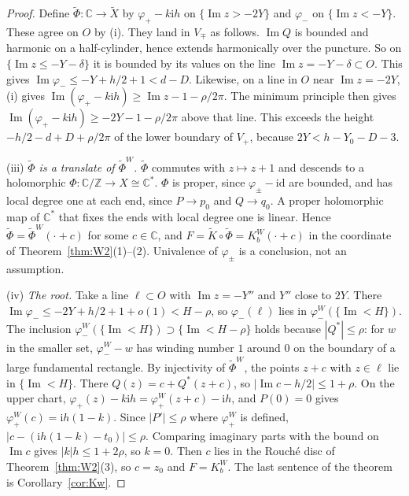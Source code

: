 \documentclass[11pt]{amsart}
\theoremstyle{definition}
\newcommand{\Kk}{K}
\newcommand{\ii}{\mathrm{i}}
\begin{document}
\begin{proof}
Define $\tilde\Phi:\mathbb C\to\tilde X$ by $\varphi_+-k\ii h$ on
$\{\operatorname{Im}z>-2Y\}$ and $\varphi_-$ on $\{\operatorname{Im}z<-Y\}$.
These agree on $O$ by (i).  They land in $V_\mp$ as follows.
$\operatorname{Im}Q$ is bounded and harmonic on a half-cylinder, hence extends
harmonically over the puncture.  So on $\{\operatorname{Im}z\le-Y-\delta\}$ it is
bounded by its values on the line $\operatorname{Im}z=-Y-\delta\subset O$.
This gives $\operatorname{Im}\varphi_-\le-Y+h/2+1<d-D$.  Likewise, on a line
in $O$ near $\operatorname{Im}z=-2Y$, (i) gives
$\operatorname{Im}(\varphi_+-k\ii h)\ge\operatorname{Im}z-1-\rho/2\pi$.  The minimum
principle then gives $\operatorname{Im}(\varphi_+-k\ii h)\ge-2Y-1-\rho/2\pi$
above that line.  This exceeds the height
$-h/2-d+D+\rho/2\pi$ of the lower boundary of $V_+$, because
$2Y<h-Y_0-D-3$.

(iii) \emph{$\tilde\Phi$ is a translate of $\tilde\Phi^W$.}  $\tilde\Phi$
commutes with $z\mapsto z+1$ and descends to a holomorphic
$\Phi:\mathbb C/\mathbb Z\to X\cong\mathbb C^*$.  $\Phi$ is proper, since
$\varphi_\pm-\mathrm{id}$ are bounded, and has local degree one at each end,
since $P\to p_0$ and $Q\to q_0$.  A proper holomorphic map of $\mathbb C^*$ that
fixes the ends with local degree one is linear.  Hence
$\tilde\Phi=\tilde\Phi^W(\cdot+c)$ for some $c\in\mathbb C$, and
$F=\tilde K\circ\tilde\Phi=\Kk^W_b(\cdot+c)$ in the coordinate of
Theorem~\ref{thm:W2}(1)--(2).  Univalence of $\varphi_\pm$ is a conclusion, not
an assumption.

(iv) \emph{The root.}  Take a line $\ell\subset O$ with
$\operatorname{Im}z=-Y''$ and $Y''$ close to $2Y$.  There
$\operatorname{Im}\varphi_-\le-2Y+h/2+1+o(1)<H-\rho$, so $\varphi_-(\ell)$ lies
in $\varphi_-^W(\{\operatorname{Im}<H\})$.  The inclusion
$\varphi_-^W(\{\operatorname{Im}<H\})\supset\{\operatorname{Im}<H-\rho\}$ holds because
$|Q^*|\le\rho$: for $w$ in the smaller set, $\varphi^W_--w$ has winding
number $1$ around $0$ on the boundary of a large fundamental rectangle.  By injectivity of
$\tilde\Phi^W$, the points $z+c$ with $z\in\ell$ lie in
$\{\operatorname{Im}<H\}$.  There $Q(z)=c+Q^*(z+c)$, so
$|\operatorname{Im}c-h/2|\le1+\rho$.  On the upper chart,
$\varphi_+(z)-k\ii h=\varphi^W_+(z+c)-\ii h$, and $P(0)=0$ gives
$\varphi^W_+(c)=\ii h(1-k)$.  Since $|P'|\le\rho$ where $\varphi^W_+$ is defined,
$|c-(\ii h(1-k)-t_0)|\le\rho$.  Comparing imaginary parts with the bound on
$\operatorname{Im}c$ gives $|k|h\le1+2\rho$, so $k=0$.  Then $c$ lies in the
Rouch\'e disc of Theorem~\ref{thm:W2}(3), so $c=z_0$ and $F=\Kk^W_b$.  The last
sentence of the theorem is Corollary~\ref{cor:Kw}.
\end{proof}
\end{document}
